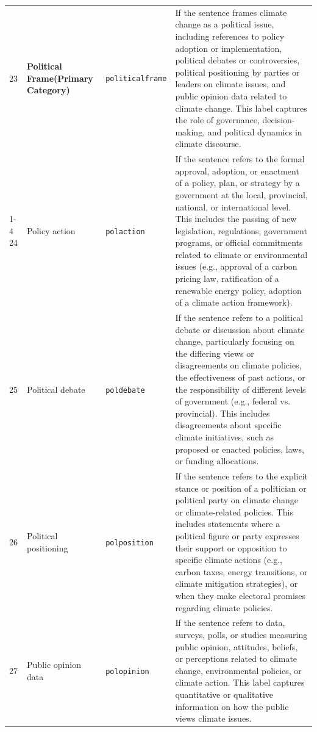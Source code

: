 \documentclass[12pt]{article}
\renewcommand\_{\texttt{\detokenize{_}\allowbreak}}
\begin{document}
{\begin{longtable}{p{0.5cm}p{4.5cm}p{2.8cm}p{13.5cm}}
\midrule
\rowcolor{gray!8}
\multicolumn{4}{l}{\textit{Political Frame}} \\
\midrule
23 & \textbf{Political Frame\newline (Primary Category)} & \texttt{political\_frame} & If the sentence frames climate change as a political issue, including references to policy adoption or implementation, political debates or controversies, political positioning by parties or leaders on climate issues, and public opinion data related to climate change. This label captures the role of governance, decision-making, and political dynamics in climate discourse. \\
\cmidrule(lr){1-4}
24 & Policy action & \texttt{pol\_action} & If the sentence refers to the formal approval, adoption, or enactment of a policy, plan, or strategy by a government at the local, provincial, national, or international level. This includes the passing of new legislation, regulations, government programs, or official commitments related to climate or environmental issues (e.g., approval of a carbon pricing law, ratification of a renewable energy policy, adoption of a climate action framework). \\
25 & Political debate & \texttt{pol\_debate} & If the sentence refers to a political debate or discussion about climate change, particularly focusing on the differing views or disagreements on climate policies, the effectiveness of past actions, or the responsibility of different levels of government (e.g., federal vs. provincial). This includes disagreements about specific climate initiatives, such as proposed or enacted policies, laws, or funding allocations. \\
26 & Political positioning & \texttt{pol\_position} & If the sentence refers to the explicit stance or position of a politician or political party on climate change or climate-related policies. This includes statements where a political figure or party expresses their support or opposition to specific climate actions (e.g., carbon taxes, energy transitions, or climate mitigation strategies), or when they make electoral promises regarding climate policies. \\
27 & Public opinion data & \texttt{pol\_opinion} & If the sentence refers to data, surveys, polls, or studies measuring public opinion, attitudes, beliefs, or perceptions related to climate change, environmental policies, or climate action. This label captures quantitative or qualitative information on how the public views climate issues. \\

\end{longtable}}
\end{document}
